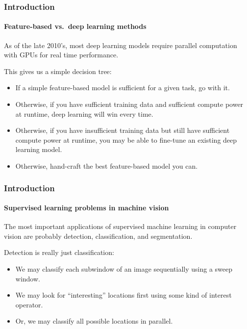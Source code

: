 \documentclass[aspectratio=169]{beamer}
\begin{document}
\begin{frame}
\frametitle{Introduction}
\framesubtitle{Feature-based vs.\ deep learning methods}

As of the late 2010's, most deep learning models require parallel
computation with GPUs for real time performance.

\medskip

This gives us a simple decision tree:
\begin{itemize}
\item If a simple feature-based model is sufficient for a given task,
  go with it.
\item Otherwise, if you have \alert{sufficient training data} and
  \alert{sufficient compute power at runtime}, deep learning will win
  every time.
\item Otherwise, if you have \alert{insufficient training data} but
  still have \alert{sufficient compute power at runtime}, you may be
  able to \alert{fine-tune} an existing deep learning model.
\item Otherwise, hand-craft the best feature-based model you can. 
\end{itemize}

\end{frame}


\begin{frame}
\frametitle{Introduction}
\framesubtitle{Supervised learning problems in machine vision}

The most important applications of supervised machine learning in
computer vision are probably \alert{detection},
\alert{classification}, and \alert{segmentation}.

\medskip

\alert{Detection is really just classification}:
\begin{itemize}
\item We may classify each subwindow of an image sequentially
  using a sweep window.
\item We may look for ``interesting'' locations first using some kind
  of interest operator.
\item Or, we may classify all possible locations in parallel.
\end{itemize}

\end{frame}
\end{document}
